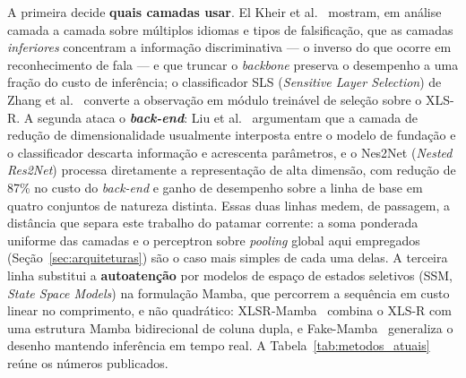 \documentclass[12pt,a4paper]{article}
\begin{document}
A primeira decide \textbf{quais camadas usar}. El Kheir et
al.~\cite{elkheir2025layerwise} mostram, em análise camada a camada sobre
múltiplos idiomas e tipos de falsificação, que as camadas \emph{inferiores}
concentram a informação discriminativa --- o inverso do que ocorre em
reconhecimento de fala --- e que truncar o \textit{backbone} preserva o
desempenho a uma fração do custo de inferência; o classificador SLS
(\textit{Sensitive Layer Selection}) de Zhang et al.~\cite{zhang2024sls}
converte a observação em módulo treinável de seleção sobre o XLS-R. A segunda
ataca o \textbf{\textit{back-end}}: Liu et al.~\cite{liu2025nes2net} argumentam
que a camada de redução de dimensionalidade usualmente interposta entre o
modelo de fundação e o classificador descarta informação e acrescenta
parâmetros, e o Nes2Net (\textit{Nested Res2Net}) processa diretamente a
representação de alta dimensão, com redução de \num{87}\% no custo do
\textit{back-end} e ganho de desempenho sobre a linha de base em quatro
conjuntos de natureza distinta. Essas duas linhas medem, de passagem, a
distância que separa este trabalho do patamar corrente: a soma ponderada
uniforme das camadas e o perceptron sobre \textit{pooling} global aqui
empregados (Seção~\ref{sec:arquiteturas}) são o caso mais simples de cada uma
delas. A terceira linha substitui a \textbf{autoatenção} por modelos de espaço
de estados seletivos (SSM, \textit{State Space Models}) na formulação Mamba,
que percorrem a sequência em custo linear no
comprimento, e não quadrático: XLSR-Mamba~\cite{xiao2025xlsrmamba} combina o
XLS-R com uma estrutura Mamba bidirecional de coluna dupla, e
Fake-Mamba~\cite{xuan2025fakemamba} generaliza o desenho mantendo inferência em
tempo real. A Tabela~\ref{tab:metodos_atuais} reúne os números publicados.
\end{document}
